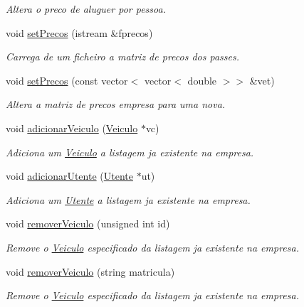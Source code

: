 \begin{DoxyCompactItemize}
\begin{DoxyCompactList}\small\item\em Altera o preco de aluguer por pessoa. \end{DoxyCompactList}\item 
void \mbox{\hyperlink{class_empresa_aad5017fad374ed1cc8f25016cc5b4eb5}{set\+Precos}} (istream \&fprecos)
\begin{DoxyCompactList}\small\item\em Carrega de um ficheiro a matriz de precos dos passes. \end{DoxyCompactList}\item 
void \mbox{\hyperlink{class_empresa_a5045b1da6fe55685e04a89d4fd61aa1a}{set\+Precos}} (const vector$<$ vector$<$ double $>$$>$ \&vet)
\begin{DoxyCompactList}\small\item\em Altera a matriz de precos empresa para uma nova. \end{DoxyCompactList}\item 
void \mbox{\hyperlink{class_empresa_abe88713c8f7666b9ae119700fc318d78}{adicionar\+Veiculo}} (\mbox{\hyperlink{class_veiculo}{Veiculo}} $\ast$vc)
\begin{DoxyCompactList}\small\item\em Adiciona um \mbox{\hyperlink{class_veiculo}{Veiculo}} a listagem ja existente na empresa. \end{DoxyCompactList}\item 
void \mbox{\hyperlink{class_empresa_ae2ff321878007fa832020aab9991dba0}{adicionar\+Utente}} (\mbox{\hyperlink{class_utente}{Utente}} $\ast$ut)
\begin{DoxyCompactList}\small\item\em Adiciona um \mbox{\hyperlink{class_utente}{Utente}} a listagem ja existente na empresa. \end{DoxyCompactList}\item 
void \mbox{\hyperlink{class_empresa_a345839f16710bfd88e3a5fbcf14a3909}{remover\+Veiculo}} (unsigned int id)
\begin{DoxyCompactList}\small\item\em Remove o \mbox{\hyperlink{class_veiculo}{Veiculo}} especificado da listagem ja existente na empresa. \end{DoxyCompactList}\item 
void \mbox{\hyperlink{class_empresa_a39f49199e53094afe62e3d4150121f6b}{remover\+Veiculo}} (string matricula)
\begin{DoxyCompactList}\small\item\em Remove o \mbox{\hyperlink{class_veiculo}{Veiculo}} especificado da listagem ja existente na empresa. \end{DoxyCompactList}\item 
$$
\end{DoxyCompactItemize}
